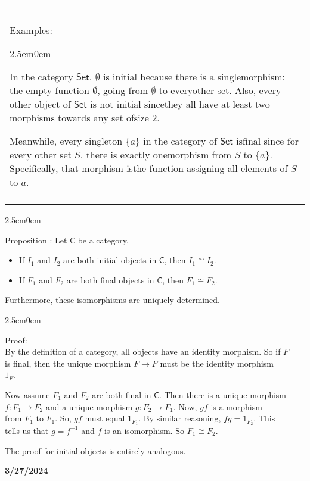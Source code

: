 \documentclass{book}
\newcommand{\hTwo}{%
   \color{MidnightBlue}%
   \fontsize{13}{15}\selectfont%
}
\newcommand{\hThree}{%
   \color{PineGreen!85!Orange}
   \fontsize{13}{15}\selectfont%
}
\newcommand{\exOne}{%
   \color{Purple}%
   \fontsize{14}{16}\selectfont%
}
\newcommand{\exTwo}{%
   \color{RedViolet}%
   \fontsize{13}{15}\selectfont%
}
\newenvironment{myIndent}{%
   \begin{adjustwidth}{2.5em}{0em}%
}{%
   \end{adjustwidth}%
}
\newcommand*{\markDate}[1]{%
   {\huge \color{Black} \textbf{#1} \newline}%
}
\newcommand{\mcateg}[1]{\mathsf{#1}}
\newcounter{PropNumber}
\newcommand{\propCount}{%
   \stepcounter{PropNumber}%
   \thePropNumber%
}
\newenvironment{myClosureOne}[2][.]{%
   \color{#1}%
   \begin{tabular}{|p{#2in}|} \hline \\%
}{%
   \\ \hline \end{tabular}%
}
\newcommand{\retTwo}{\hfill\bigbreak}
\begin{document}
{\begin{center}\exOne
   \begin{myClosureOne}{5}
      \\ [-24pt]
      Examples:
      \begin{myIndent} \exTwo
         In the category $\mcateg{Set}$, $\emptyset$ is initial because there is a single\newline morphism: the empty function $\emptyset$, going from $\emptyset$ to every\newline other set. Also, every other object of $\mcateg{Set}$ is not initial since\newline they all have at least two morphisms towards any set of\newline size 2.\retTwo

         Meanwhile, every singleton $\{a\}$ in the category of $\mcateg{Set}$ is\newline final since for every other set $S$, there is exactly one\newline morphism from $S$ to $\{a\}$. Specifically, that morphism is\newline the function assigning all elements of $S$ to $a$.
      \end{myIndent}
      \\ [-16.4pt]
   \end{myClosureOne}\retTwo
\end{center}}

{\begin{myIndent} \hTwo
   Proposition \propCount: Let $\mcateg{C}$ be a category.
   \begin{itemize}
      \item If $I_1$ and $I_2$ are both initial objects in $\mcateg{C}$, then $I_1 \cong I_2$.
      \item If $F_1$ and $F_2$ are both final objects in $\mcateg{C}$, then $F_1 \cong F_2$.
   \end{itemize}
   Furthermore, these isomorphisms are uniquely determined.

   {\begin{myIndent} \hThree
      Proof:\\
      By the definition of a category, all objects have an identity morphism. So if $F$\\ is final, then the unique morphism $F \longrightarrow F$ must be the identity morphism\\ $1_F$.\retTwo

      Now assume $F_1$ and $F_2$ are both final in $\mcateg{C}$. Then there is a unique morphism\\ $f: F_1 \longrightarrow F_2$ and a unique morphism $g: F_2 \longrightarrow F_1$. Now, $gf$ is a morphism\\ from $F_1$ to $F_1$. So, $gf$ must equal $1_{F_1}$. By similar reasoning, $fg = 1_{F_2}$. This\\ tells us that $g = f^{-1}$ and $f$ is an isomorphism. So $F_1 \cong F_2$.

      \newpage

      The proof for initial objects is entirely analogous. \retTwo
   \end{myIndent}}
\end{myIndent}}

\markDate{3/27/2024}
\end{document}
